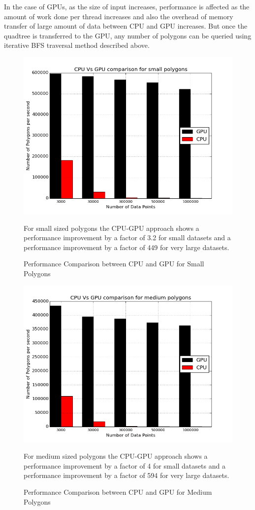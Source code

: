 \documentclass{article}
\begin{document}
In the case of GPUs, as the size of input increases, performance is affected as the amount of work done per thread increases and also the overhead of memory transfer of large amount of data between CPU and GPU increases. But once the quadtree is transferred to the GPU, any number of polygons can be queried using iterative BFS traversal method described above. 



\begin{figure}[ht]
\caption{Performance Comparison between CPU and GPU for Small Polygons}
\includegraphics[scale=0.5]{CPU_GPU_SmallPoly3}

For small sized polygons the CPU-GPU approach shows a performance improvement by a factor of 3.2 for small datasets and a performance improvement by a factor of 449 for very large datasets.
\end{figure}

\begin{figure}[ht]
\caption{Performance Comparison between CPU and GPU for Medium Polygons}
\includegraphics[scale=0.5]{CPU_GPU_MediumPoly3}

For medium sized polygons the CPU-GPU approach shows a performance improvement by a factor of 4 for small datasets and a performance improvement by a factor of 594 for very large datasets.
\end{figure}
\end{document}
